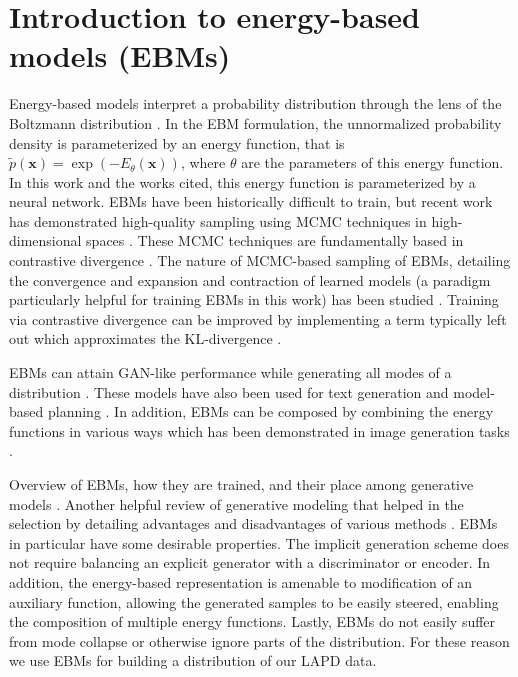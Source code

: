 \section{Introduction to energy-based models (EBMs)}

Energy-based models interpret a probability distribution through the lens of the Boltzmann distribution \cite{hopfield_neural_1982, ackley_learning_1985, lecun_tutorial_2006}. In the EBM formulation, the unnormalized probability density is parameterized by an energy function, that is $\tilde{p}(\mathbf{x}) = \exp(-E_\theta(\mathbf{x}))$, where $\theta$ are the parameters of this energy function. In this work and the works cited, this energy function is parameterized by a neural network. EBMs have been historically difficult to train, but recent work has demonstrated high-quality sampling using MCMC techniques in high-dimensional spaces \cite{du_model_2019, du_implicit_2020, du_improved_2021, du_compositional_2020, du_unsupervised_2021, nijkamp_anatomy_2020, nijkamp_learning_2019, deng_residual_2020, gao_learning_2018}. These MCMC techniques are fundamentally based in contrastive divergence \cite{hinton_training_2002, ruslan_deep_2009, tieleman_training_2008}. The nature of MCMC-based sampling of EBMs, detailing the convergence and expansion and contraction of learned models (a paradigm particularly helpful for training EBMs in this work) has been studied \cite{nijkamp_anatomy_2020, nijkamp_learning_2019}. Training via contrastive divergence can be improved by implementing a term typically left out which approximates the KL-divergence \cite{du_improved_2021}. 

EBMs can attain GAN-like performance while generating all modes of a distribution \cite{du_implicit_2020}. These models have also been used for text generation \cite{deng_residual_2020} and model-based planning \cite{du_model_2019}. In addition, EBMs can be composed by combining the energy functions in various ways which has been demonstrated in image generation tasks \cite{du_compositional_2020, du_unsupervised_2021}.

Overview of EBMs, how they are trained, and their place among generative models \cite{carbone_hitchhikers_2024}. Another helpful review of generative modeling that helped in the selection by detailing advantages and disadvantages of various methods \cite{bond-taylor_deep_2021}. EBMs in particular have some desirable properties. The implicit generation scheme does not require balancing an explicit generator with a discriminator or encoder. In addition, the energy-based representation is amenable to modification of an auxiliary function, allowing the generated samples to be easily steered, enabling the composition of multiple energy functions. Lastly, EBMs do not easily suffer from mode collapse or otherwise ignore parts of the distribution. For these reason we use EBMs for building a distribution of our LAPD data.

